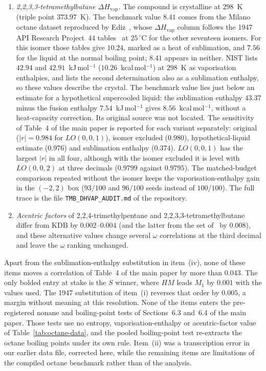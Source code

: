 \documentclass[a5paper, 10pt]{article}
\theoremstyle{plain}
\theoremstyle{remark}
\theoremstyle{definition}
\begin{document}
\begin{enumerate}[label=(\roman*)]
  in $|r|$, and moves the margin between $HM$ and $M_1$ at the top from
  $0.001$ to $0.007$.
\item \emph{2,2,3,3-tetramethylbutane $\Delta H_{\mathrm{vap}}$.} The
  compound is crystalline at $298$~K (triple point $373.97$~K). The
  benchmark value $8.41$ comes from the Milano octane dataset reproduced
  by Ediz~\cite{Ediz2017Octane}, whose $\Delta H_{\mathrm{vap}}$ column
  follows the 1947 API Research Project~44 tables~\cite{APIProject44Circ461}
  at $25\,^{\circ}$C for the other seventeen isomers. For this isomer those
  tables give $10.24$, marked as a heat of sublimation, and $7.56$ for the
  liquid at the normal boiling point; $8.41$ appears in neither. NIST lists
  $42.94$ and $42.91$~kJ\,mol$^{-1}$ ($10.26$~kcal\,mol$^{-1}$) at $298$~K as
  vaporisation enthalpies, and lists the second determination also as a
  sublimation enthalpy, so these values describe the crystal. The benchmark value lies just below an estimate for a hypothetical supercooled liquid: the sublimation enthalpy $43.37$ minus the fusion enthalpy $7.54$~kJ\,mol$^{-1}$
  gives $8.56$~kcal\,mol$^{-1}$, without a heat-capacity correction. Its
  original source was not located. The sensitivity of Table~4 of the main
  paper is reported for each variant separately: original
  ($|r| = 0.984$ for $LO(0,0,1)$), isomer excluded ($0.980$),
  hypothetical-liquid estimate ($0.976$) and sublimation enthalpy
  ($0.374$). $LO(0,0,1)$ has the largest $|r|$ in all four, although with the isomer excluded it is level with $LO(0,0,2)$ at three decimals ($0.9799$ against $0.9795$). The matched-budget
  comparison repeated without the isomer keeps the vaporisation-enthalpy
  gain in the $(-2,2)$ box ($93/100$ and $96/100$ seeds instead of
  $100/100$). The full trace is the file \texttt{TMB\_DHVAP\_AUDIT.md} of
  the repository.
\item \emph{Acentric factors} of 2,2,4-trimethyl\-pentane and
  2,2,3,3-tetra\-methyl\-butane differ from KDB by $0.002$--$0.004$ (and the latter from the set of~\cite{Ediz2017Octane} by $0.008$), and these alternative values change several $\omega$
  correlations at the third decimal and leave the $\omega$ ranking
  unchanged.
\end{enumerate}
Apart from the sublimation-enthalpy substitution in item~(iv), none of these items
moves a correlation of Table~4 of the main paper by more than $0.043$. The only bolded entry at stake is the $S$ winner,
where $HM$ leads $M_1$ by $0.001$ with the values used. The 1947
substitution of item~(i) reverses that order by $0.005$, a margin
without meaning at this resolution. None of the items enters the
pre-registered nonane and boiling-point tests of Sections~6.3 and~6.4 of the main paper.
Those tests use no entropy, vaporisation-enthalpy or acentric-factor value of
Table~\ref{tab:octane-data}, and the pooled boiling-point test re-extracts
the octane boiling points under its own rule. Item~(ii) was a transcription error in our
earlier data file, corrected here, while the remaining items are limitations
of the compiled octane benchmark rather than of the analysis.
\end{document}
